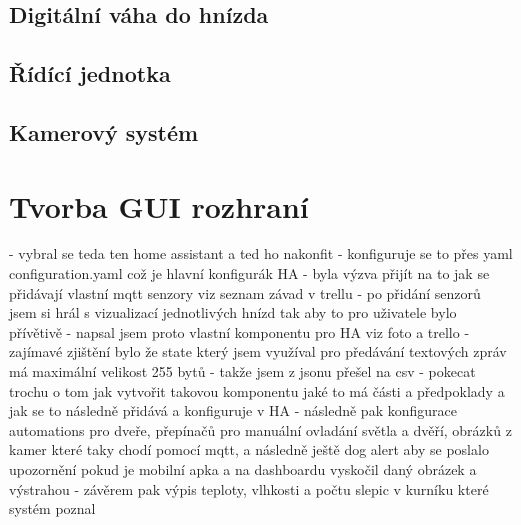 \subsection{Digitální váha do hnízda}\label{subsec:digitalni-vaha-do-hnizda}

\subsection{Řídící jednotka}\label{subsec:ridici-jednotka}

\subsection{Kamerový systém}\label{subsec:kamerovy-system}


\section{Tvorba GUI rozhraní}\label{sec:tvorba-gui-rozhrani}
- vybral se teda ten home assistant a ted ho nakonfit\newline
- konfiguruje se to přes yaml configuration.yaml což je hlavní konfigurák HA\newline
- byla výzva přijít na to jak se přidávají vlastní mqtt senzory viz seznam závad v trellu\newline
- po přidání senzorů jsem si hrál s vizualizací jednotlivých hnízd tak aby to pro uživatele bylo přívětivě\newline
- napsal jsem proto vlastní komponentu pro HA viz foto a trello\newline
- zajímavé zjištění bylo že state který jsem využíval pro předávání textových zpráv má maximální velikost 255 bytů\newline
- takže jsem z jsonu přešel na csv\newline
- pokecat trochu o tom jak vytvořit takovou komponentu jaké to má části a předpoklady a jak se to následně přidává a konfiguruje v HA\newline
- následně pak konfigurace automations pro dveře, přepínačů pro manuální ovladání světla a dvěří, obrázků z kamer které taky chodí pomocí mqtt, a následně ještě dog alert aby se poslalo upozornění pokud je mobilní apka a na dashboardu vyskočil daný obrázek a výstrahou\newline
- závěrem pak výpis teploty, vlhkosti a počtu slepic v kurníku které systém poznal\newline


